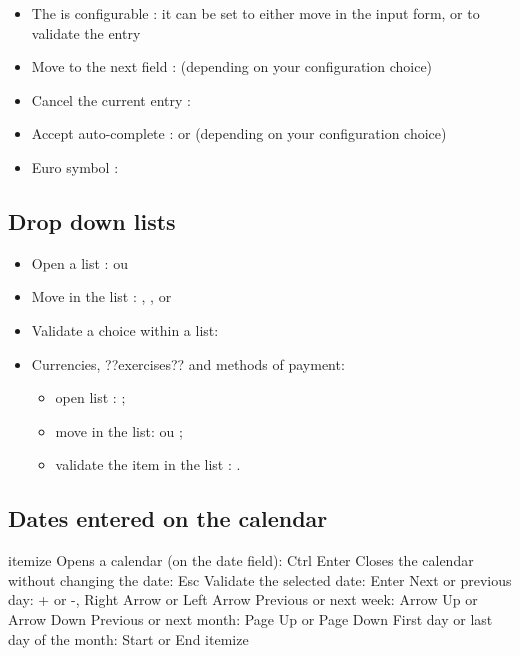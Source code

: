 \begin{itemize}
	\item The  is configurable : it can be set to either move in the input form, or to validate the entry
	\item Move to the next field :  (depending on your configuration choice)
	\item Cancel the current entry : 
	\item Accept auto-complete :  or  (depending on your configuration choice)
	\item  Euro symbol : 
\end{itemize}

\subsection{Drop down lists}

\begin{itemize}
	 \item Open a list :  ou 
	 \item Move in the list : , ,  or 
	 \item Validate a choice within a list: 
	 \item Currencies, ??exercises?? and methods of payment:
		\begin{itemize}
			\item open list :  ; 
			\item move in the list:  ou  ;
			\item validate the item in the list : .
		\end{itemize}
\end{itemize}


\subsection{Dates entered on the calendar}

itemize
Opens a calendar (on the date field): Ctrl Enter
Closes the calendar without changing the date: Esc
Validate the selected date: Enter
Next or previous day: + or -, Right Arrow or Left Arrow
Previous or next week: Arrow Up or Arrow Down
Previous or next month: Page Up or Page Down
First day or last day of the month: Start or End
itemize

